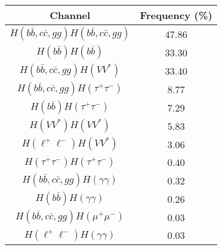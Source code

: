 \begin{tabular}{|c|c|}
\hline
  Channel & Frequency (\%) \\
\hline
$H(b\bar{b},c\bar{c},gg)H(b\bar{b},c\bar{c},gg)$ & 47.86 \\

$H(b\bar{b})H(b\bar{b})$ & 33.30 \\

$H(b\bar{b},c\bar{c},gg)H(VV^{*})$ & 33.40 \\

$H(b\bar{b},c\bar{c},gg)H(\tau^{+}\tau^{-})$ & 8.77    \\

$H(b\bar{b})H(\tau^{+}\tau^{-})$ & 7.29    \\

$H(VV^*)H(VV^{*})$ & 5.83  \\

$H(\ell^{+}\ell^{-})H(VV^{*})$ & 3.06   \\

$H(\tau^{+}\tau^{-})H(\tau^{+}\tau^{-})$ & 0.40 \\

%
$H(b\bar{b},c\bar{c},gg)H(\gamma\gamma)$ & 0.32   \\

$H(b\bar{b})H(\gamma\gamma)$ & 0.26   \\

$H(b\bar{b},c\bar{c},gg)H(\mu^{+}\mu^{-})$ & 0.03   \\

$H(\ell^{+}\ell^{-})H(\gamma\gamma)$ & 0.03   \\
\hline
\end{tabular}
